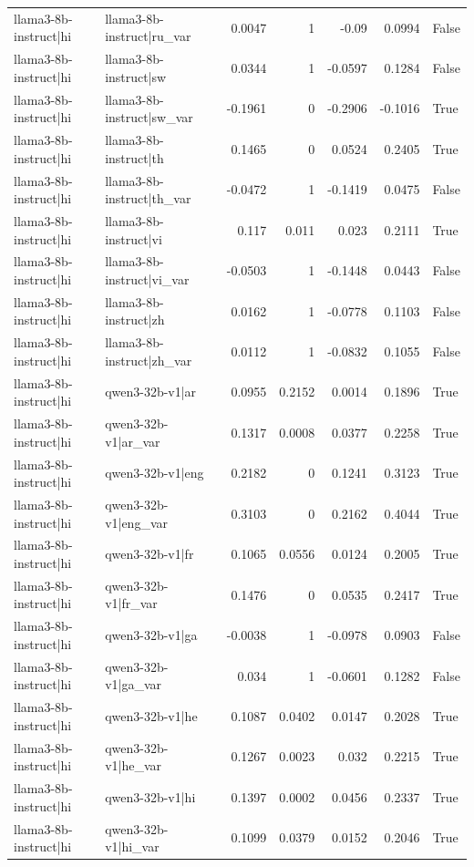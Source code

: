 \begin{table}
\begin{tabular}{l l r r r r l}
llama3-8b-instruct|hi & llama3-8b-instruct|ru_var & 0.0047 & 1 & -0.09 & 0.0994 & False \\
llama3-8b-instruct|hi & llama3-8b-instruct|sw & 0.0344 & 1 & -0.0597 & 0.1284 & False \\
llama3-8b-instruct|hi & llama3-8b-instruct|sw_var & -0.1961 & 0 & -0.2906 & -0.1016 & True \\
llama3-8b-instruct|hi & llama3-8b-instruct|th & 0.1465 & 0 & 0.0524 & 0.2405 & True \\
llama3-8b-instruct|hi & llama3-8b-instruct|th_var & -0.0472 & 1 & -0.1419 & 0.0475 & False \\
llama3-8b-instruct|hi & llama3-8b-instruct|vi & 0.117 & 0.011 & 0.023 & 0.2111 & True \\
llama3-8b-instruct|hi & llama3-8b-instruct|vi_var & -0.0503 & 1 & -0.1448 & 0.0443 & False \\
llama3-8b-instruct|hi & llama3-8b-instruct|zh & 0.0162 & 1 & -0.0778 & 0.1103 & False \\
llama3-8b-instruct|hi & llama3-8b-instruct|zh_var & 0.0112 & 1 & -0.0832 & 0.1055 & False \\
llama3-8b-instruct|hi & qwen3-32b-v1|ar & 0.0955 & 0.2152 & 0.0014 & 0.1896 & True \\
llama3-8b-instruct|hi & qwen3-32b-v1|ar_var & 0.1317 & 0.0008 & 0.0377 & 0.2258 & True \\
llama3-8b-instruct|hi & qwen3-32b-v1|eng & 0.2182 & 0 & 0.1241 & 0.3123 & True \\
llama3-8b-instruct|hi & qwen3-32b-v1|eng_var & 0.3103 & 0 & 0.2162 & 0.4044 & True \\
llama3-8b-instruct|hi & qwen3-32b-v1|fr & 0.1065 & 0.0556 & 0.0124 & 0.2005 & True \\
llama3-8b-instruct|hi & qwen3-32b-v1|fr_var & 0.1476 & 0 & 0.0535 & 0.2417 & True \\
llama3-8b-instruct|hi & qwen3-32b-v1|ga & -0.0038 & 1 & -0.0978 & 0.0903 & False \\
llama3-8b-instruct|hi & qwen3-32b-v1|ga_var & 0.034 & 1 & -0.0601 & 0.1282 & False \\
llama3-8b-instruct|hi & qwen3-32b-v1|he & 0.1087 & 0.0402 & 0.0147 & 0.2028 & True \\
llama3-8b-instruct|hi & qwen3-32b-v1|he_var & 0.1267 & 0.0023 & 0.032 & 0.2215 & True \\
llama3-8b-instruct|hi & qwen3-32b-v1|hi & 0.1397 & 0.0002 & 0.0456 & 0.2337 & True \\
llama3-8b-instruct|hi & qwen3-32b-v1|hi_var & 0.1099 & 0.0379 & 0.0152 & 0.2046 & True \\

\end{tabular}
\end{table}
